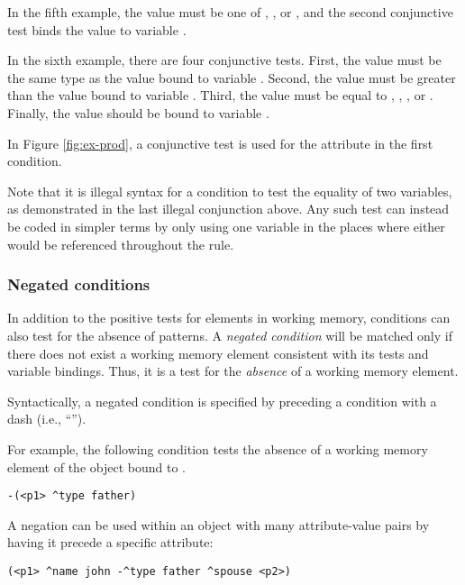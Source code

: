 In the fifth example, the value must be one of , , or , and the second conjunctive test binds the value to variable . 

In the sixth example, there are four conjunctive tests. First, the value must be the same type as the value bound to variable . Second, the value must be greater than the value bound to variable . Third, the value must be equal to , , , or . Finally, the value should be bound to variable .

In Figure \ref{fig:ex-prod}, a conjunctive test is used for the  attribute in the first condition.

Note that it is illegal syntax for a condition to test the equality of two variables, as demonstrated in the last illegal conjunction above. Any such test can instead be coded in simpler terms by only using one variable in the places where either would be referenced throughout the rule.

\subsubsection{Negated conditions}
\label{SYNTAX-pm-lhs-negated}
\index{-}

In addition to the positive tests for elements in working memory, conditions can also test for the absence of patterns.  A \emph{negated condition} will be matched only if there does not exist a working memory element consistent with its tests and variable bindings. Thus, it is a test for the \textit{absence} of a working memory element.

Syntactically, a negated condition is specified by preceding a condition with a dash (i.e., ``\soar{-}'').

For example, the following condition tests the absence of a working memory element of the object bound to .

\begin{verbatim}
-(<p1> ^type father)
\end{verbatim} 
\vspace{12pt}

A negation can be used within an object with many attribute-value pairs by having it precede a specific attribute:

\begin{verbatim}
(<p1> ^name john -^type father ^spouse <p2>)
\end{verbatim} \vspace{12pt}

